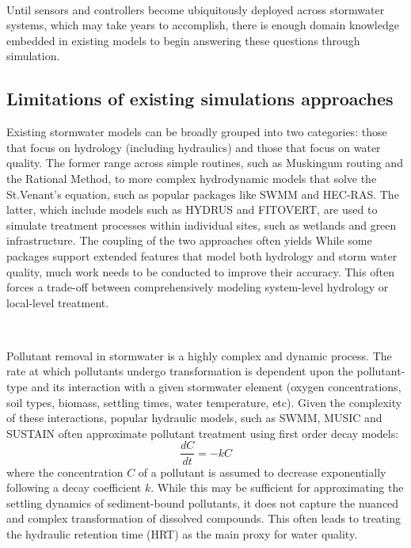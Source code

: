 \

Until sensors and controllers become ubiquitously deployed across stormwater systems, which may take years to accomplish, there is enough domain knowledge embedded in existing models to begin answering these questions through simulation. 


\subsection{Limitations of existing simulations approaches}
Existing stormwater models can be broadly grouped into two categories: those
that focus on hydrology (including hydraulics) and those that focus on water quality. The former range across simple routines, such as Muskingum routing\cite{Brunner1991ANetworks} and the Rational Method\cite{Chin2000Water-resourcesEngineering}, to more complex hydrodynamic models that solve the St.Venant's equation, such as popular packages like SWMM\cite{Rossman2010Storm5.1} and HEC-RAS\cite{Brunner2016HECManual}. The latter, which include models such as HYDRUS\cite{Rizzo2014ModellingHYDRUS-CWM1,Palfy2014TheData} and FITOVERT\cite{Giraldi2010FITOVERT:Wetlands},  are used to simulate treatment processes within individual sites, such as wetlands and green infrastructure. The coupling of the two approaches often yields  
While some packages support extended features that model both hydrology and
storm water quality, much work needs to be conducted to improve their
accuracy. This often forces a trade-off between
comprehensively modeling system-level hydrology or local-level treatment.

\

Pollutant removal in stormwater is a highly complex and dynamic process. The rate at which pollutants undergo transformation is dependent upon the pollutant-type and its interaction with a given stormwater element (oxygen concentrations, soil types, biomass, settling times, water temperature, etc). Given the complexity of these interactions, popular hydraulic models, such as SWMM, MUSIC\cite{Wong2002AConceptualisation} and SUSTAIN\cite{Lai2007SUSTAINWATERSHEDS} often approximate pollutant treatment using first order decay models\cite{Kadlec2008TreatmentWetlands}:
\begin{equation}
	\frac{dC}{dt}=-kC
\end{equation}
where the concentration $C$ of a pollutant is assumed to decrease exponentially following a decay coefficient $k$. While this may be sufficient for approximating the settling dynamics of sediment-bound pollutants, it does not capture the nuanced and complex transformation of dissolved compounds. This often leads to treating the hydraulic retention time (HRT) as the main proxy for water quality. 

